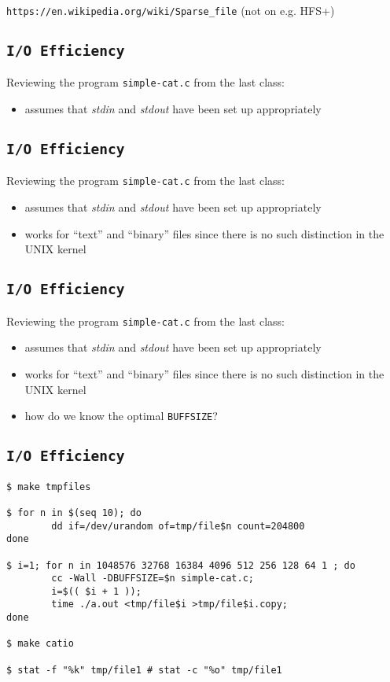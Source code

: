 \documentclass[xga]{xdvislides}
\begin{document}
\verb+https://en.wikipedia.org/wiki/Sparse_file+ (not on e.g. HFS+)


\subsection{{\tt I/O Efficiency}}
Reviewing the program {\tt simple-cat.c} from the last class:
\begin{itemize}
	\item assumes that {\em stdin} and {\em stdout} have been set up
		appropriately
\end{itemize}

\subsection{{\tt I/O Efficiency}}
Reviewing the program {\tt simple-cat.c} from the last class:
\begin{itemize}
	\item assumes that {\em stdin} and {\em stdout} have been set up
		appropriately
	\item works for ``text'' and ``binary'' files since there is no such
		distinction in the UNIX kernel
\end{itemize}

\subsection{{\tt I/O Efficiency}}
Reviewing the program {\tt simple-cat.c} from the last class:
\begin{itemize}
	\item assumes that {\em stdin} and {\em stdout} have been set up
		appropriately
	\item works for ``text'' and ``binary'' files since there is no such
		distinction in the UNIX kernel
	\item how do we know the optimal {\tt BUFFSIZE}?
\end{itemize}

\subsection{{\tt I/O Efficiency}}
\begin{verbatim}
$ make tmpfiles

$ for n in $(seq 10); do
        dd if=/dev/urandom of=tmp/file$n count=204800
done

$ i=1; for n in 1048576 32768 16384 4096 512 256 128 64 1 ; do
        cc -Wall -DBUFFSIZE=$n simple-cat.c;
        i=$(( $i + 1 ));
        time ./a.out <tmp/file$i >tmp/file$i.copy;
done

$ make catio

$ stat -f "%k" tmp/file1 # stat -c "%o" tmp/file1
\end{verbatim}
\end{document}
